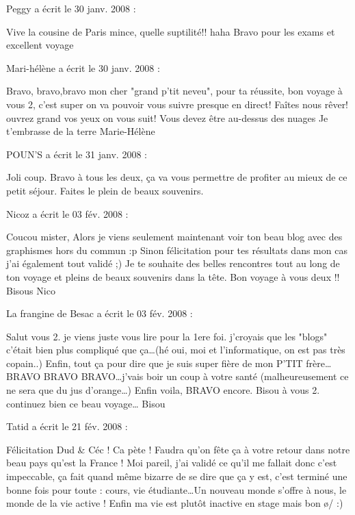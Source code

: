 \medskip
Peggy a écrit le 30 janv. 2008 :
\begin{displayquote}
Vive la cousine de Paris mince, quelle suptilité!! haha
Bravo pour les exams et excellent voyage
\end{displayquote}

\medskip
Mari-hélène a écrit le 30 janv. 2008 :
\begin{displayquote}
Bravo, bravo,bravo mon cher "grand p'tit neveu", pour ta réussite, bon voyage à vous 2, c'est super on va pouvoir vous suivre presque en direct! Faîtes nous rêver! ouvrez grand vos yeux on vous suit!
Vous devez être au-dessus des nuages
Je t'embrasse de la terre
Marie-Hélène
\end{displayquote}

\medskip
POUN'S a écrit le 31 janv. 2008 :
\begin{displayquote}
Joli coup.
Bravo à tous les deux, ça va vous permettre de profiter au mieux de ce petit séjour. Faites le plein de beaux souvenirs.
\end{displayquote}

\medskip
Nicoz a écrit le 03 fév. 2008 :
\begin{displayquote}
Coucou mister,
Alors je viens seulement maintenant voir ton beau blog avec des graphismes hors du commun :p
Sinon félicitation pour tes résultats dans mon cas j'ai également tout validé ;)
Je te souhaite des belles rencontres tout au long de ton voyage et pleins de beaux souvenirs dans la tête.
Bon voyage à vous deux !!
Bisous
Nico
\end{displayquote}

\medskip
La frangine de Besac a écrit le 03 fév. 2008 :
\begin{displayquote}
Salut vous 2. je viens juste vous lire pour la 1ere foi. j'croyais que les "blogs" c'était bien plus compliqué que ça\dots (hé oui, moi et l'informatique, on est pas très copain..)
Enfin, tout ça pour dire que je suis super fière de mon P'TIT frère\dots BRAVO BRAVO BRAVO\dots j'vais boir un coup à votre santé (malheureusement ce ne sera que du jus d'orange\dots)
Enfin voila, BRAVO encore.
Bisou à vous 2. continuez bien ce beau voyage\dots
Bisou
\end{displayquote}

\medskip
Tatid a écrit le 21 fév. 2008 :
\begin{displayquote}
Félicitation Dud \& Céc ! Ca pète !
Faudra qu'on fête ça à votre retour dans notre beau pays qu'est la France !
Moi pareil, j'ai validé ce qu'il me fallait donc c'est impeccable, ça fait quand même bizarre de se dire que ça y est, c'est terminé une bonne fois pour toute : cours, vie étudiante\dots Un nouveau monde s'offre à nous, le monde de la vie active ! Enfin ma vie est plutôt inactive en stage mais bon \o/ :)
\end{displayquote}

\vfill
